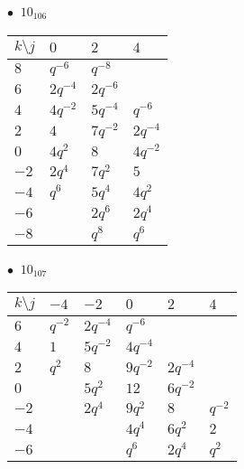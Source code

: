 \begin{minipage}{\linewidth}
$\bullet\ $ $10_{106}$ \vspace{0.5em} \\
\begin{tabular}{l|lll}
$k \setminus j$ & $0$ & $2$ & $4$ \\
\hline
$8$ & $q^{-6}$ & $q^{-8}$ &  \\
$6$ & $2q^{-4}$ & $2q^{-6}$ &  \\
$4$ & $4q^{-2}$ & $5q^{-4}$ & $q^{-6}$ \\
$2$ & $4$ & $7q^{-2}$ & $2q^{-4}$ \\
$0$ & $4q^{2}$ & $8$ & $4q^{-2}$ \\
$-2$ & $2q^{4}$ & $7q^{2}$ & $5$ \\
$-4$ & $q^{6}$ & $5q^{4}$ & $4q^{2}$ \\
$-6$ &  & $2q^{6}$ & $2q^{4}$ \\
$-8$ &  & $q^{8}$ & $q^{6}$ \\
\end{tabular}
\vspace{2em}
\end{minipage}
%
\begin{minipage}{\linewidth}
$\bullet\ $ $10_{107}$ \vspace{0.5em} \\
\begin{tabular}{l|lllll}
$k \setminus j$ & $-4$ & $-2$ & $0$ & $2$ & $4$ \\
\hline
$6$ & $q^{-2}$ & $2q^{-4}$ & $q^{-6}$ &  &  \\
$4$ & $1$ & $5q^{-2}$ & $4q^{-4}$ &  &  \\
$2$ & $q^{2}$ & $8$ & $9q^{-2}$ & $2q^{-4}$ &  \\
$0$ &  & $5q^{2}$ & $12$ & $6q^{-2}$ &  \\
$-2$ &  & $2q^{4}$ & $9q^{2}$ & $8$ & $q^{-2}$ \\
$-4$ &  &  & $4q^{4}$ & $6q^{2}$ & $2$ \\
$-6$ &  &  & $q^{6}$ & $2q^{4}$ & $q^{2}$ \\
\end{tabular}
\vspace{2em}
\end{minipage}
%
